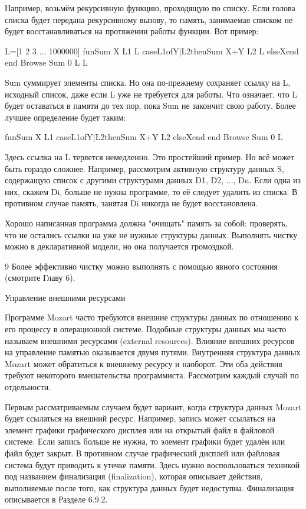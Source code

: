 Например, возьмём рекурсивную функцию, проходящую по списку. Если голова списка будет передана рекурсивному вызову, то память, занимаемая списком не будет восстанавливаться на протяжении работы функции. Вот пример:

L=[1 2 3 ... 1000000]
fun{Sum X L1 L}
caseL1ofY|L2then{Sum X+Y L2 L}
elseXend
end
{Browse {Sum 0 L L}}

Sum суммирует элементы списка. Но она по-прежнему сохраняет ссылку на L, исходный список, даже если L уже не требуется для работы. Что означает, что L будет оставаться в памяти до тех пор, пока Sum не закончит свою работу. Более лучшее определение будет таким:

fun{Sum X L1}
caseL1ofY|L2then{Sum X+Y L2}
elseXend
end
{Browse {Sum 0 L}}

Здесь ссылка на L теряется немедленно. Это простейший пример. Но всё может быть гораздо сложнее. Например, рассмотрим активную структуру данных S, содержащую список с другими структурами данных D1, D2, ..., Dn. Если одна из них, скажем Di, больше не нужна программе, то её следует удалить из списка. В противном случае память, занятая Di никогда не будет восстановлена.

Хорошо написанная программа должна "очищать" память за собой: проверять, что не остались ссылки на уже не нужные структуры данных. Выполнять чистку можно в декларативной модели, но она получается громоздкой.

9 Более эффективно чистку можно выполнять с помощью явного состояния (смотрите Главу 6).

Управление внешними ресурсами

Программе Mozart часто требуются внешние структуры данных по отношению к его процессу в операционной системе. Подобные структуры данных мы часто называем внешними ресурсами (external resources). Влияние внешних ресурсов на управление памятью оказывается двумя путями. Внутренняя структура данных Mozart может обратиться к внешнему ресурсу и наоборот. Эти оба действия требуют некоторого вмешательства программиста. Рассмотрим каждый случай по отдельности.

Первым рассматриваемым случаем будет вариант, когда структура данных Mozart будет ссылаться на внешний ресурс. Например, запись может ссылаться на элемент графики графического дисплея или на открытый файл в файловой системе. Если запись больше не нужна, то элемент графики будет удалён или файл будет закрыт. В противном случае графический дисплей или файловая система будут приводить к утечке памяти. Здесь нужно воспользоваться техникой под названием финализация (finalization), которая описывает действия, выполняемые после того, как структура данных будет недоступна. Финализация описывается в Разделе 6.9.2.

